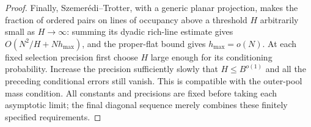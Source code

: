 \begin{proof}
Finally, Szemer\'edi--Trotter, with a generic planar projection, makes the fraction of ordered pairs on lines of occupancy above a threshold $H$ arbitrarily small as $H\to\infty$: summing its dyadic rich-line estimate gives $O(N^2/H+N h_{\max})$, and the proper-flat bound gives $h_{\max}=o(N)$.  At each fixed selection precision first choose $H$ large enough for its conditioning probability.  Increase the precision sufficiently slowly that $H\le B^{o(1)}$ and all the preceding conditional errors still vanish.  This is compatible with the outer-pool mass condition. All constants and precisions are fixed before taking each asymptotic limit; the final diagonal sequence merely combines these finitely specified requirements.
\end{proof}
